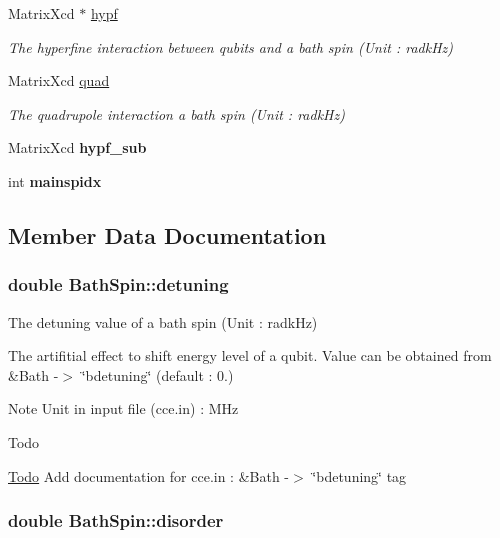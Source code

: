 \begin{DoxyCompactItemize}
Matrix\-Xcd $\ast$ \hyperlink{structBathSpin_aad4ead2e39f4ae27fab5701662e7ee27}{hypf}
\begin{DoxyCompactList}\small\item\em The hyperfine interaction between qubits and a bath spin (Unit \-: radk\-Hz) \end{DoxyCompactList}\item 
Matrix\-Xcd \hyperlink{structBathSpin_a304f556a5ba51a1275171e40d212d0d2}{quad}
\begin{DoxyCompactList}\small\item\em The quadrupole interaction a bath spin (Unit \-: radk\-Hz) \end{DoxyCompactList}\item 
\hypertarget{structBathSpin_afb32f13329ea501039ad7d62d0e6e2a5}{Matrix\-Xcd {\bfseries hypf\-\_\-sub}}\label{structBathSpin_afb32f13329ea501039ad7d62d0e6e2a5}

\item 
\hypertarget{structBathSpin_a26db008dfcd1cbdff57b63dfdbfbaf78}{int {\bfseries mainspidx}}\label{structBathSpin_a26db008dfcd1cbdff57b63dfdbfbaf78}

\end{DoxyCompactItemize}


\subsection{Member Data Documentation}
\hypertarget{structBathSpin_a045005fcc1f5517a81e47e4a8b30e2f4}{
\subsubsection[{detuning}]{\setlength{\rightskip}{0pt plus 5cm}double Bath\-Spin\-::detuning}}\label{structBathSpin_a045005fcc1f5517a81e47e4a8b30e2f4}


The detuning value of a bath spin (Unit \-: radk\-Hz) 

The artifitial effect to shift energy level of a qubit. Value can be obtained from \&Bath -\/$>$ \char`\"{}bdetuning\char`\"{} (default \-: 0.) \begin{DoxyNote}{Note}
Unit in input file (cce.\-in) \-: M\-Hz 
\end{DoxyNote}
\begin{DoxyRefDesc}{Todo}
\item[\hyperlink{todo__todo000006}{Todo}]Add documentation for cce.\-in \-: \&Bath -\/$>$ \char`\"{}bdetuning\char`\"{} tag \end{DoxyRefDesc}
\hypertarget{structBathSpin_aad59ec954d15643047790f148dcca39b}{
\subsubsection[{disorder}]{\setlength{\rightskip}{0pt plus 5cm}double Bath\-Spin\-::disorder}}\label{structBathSpin_aad59ec954d15643047790f148dcca39b}



